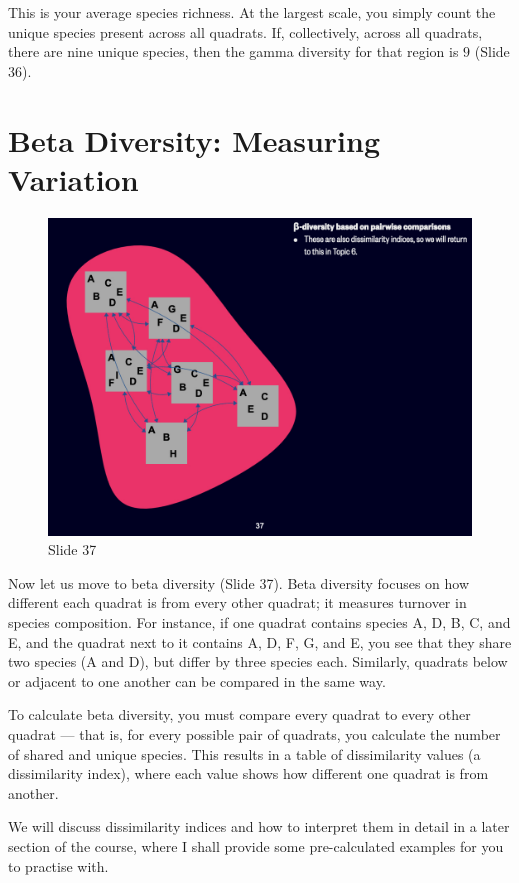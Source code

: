 \documentclass[
  11pt,
]{book}
\begin{document}
This is your average species richness. At the largest scale, you simply
count the unique species present across all quadrats. If, collectively,
across all quadrats, there are nine unique species, then the gamma
diversity for that region is \(9\) (Slide 36).

\section{Beta Diversity: Measuring
Variation}\label{beta-diversity-measuring-variation}

\begin{figure}[ht]
\centering
\includegraphics[width=0.8\linewidth]{../images/BDC334/BDC334-037.jpeg}
\caption*{Slide 37}
\end{figure}

Now let us move to beta diversity (Slide 37). Beta diversity focuses on
how different each quadrat is from every other quadrat; it measures
turnover in species composition. For instance, if one quadrat contains
species A, D, B, C, and E, and the quadrat next to it contains A, D, F,
G, and E, you see that they share two species (A and D), but differ by
three species each. Similarly, quadrats below or adjacent to one another
can be compared in the same way.

To calculate beta diversity, you must compare every quadrat to every
other quadrat --- that is, for every possible pair of quadrats, you
calculate the number of shared and unique species. This results in a
table of dissimilarity values (a dissimilarity index), where each value
shows how different one quadrat is from another.

We will discuss dissimilarity indices and how to interpret them in
detail in a later section of the course, where I shall provide some
pre-calculated examples for you to practise with.
\end{document}
